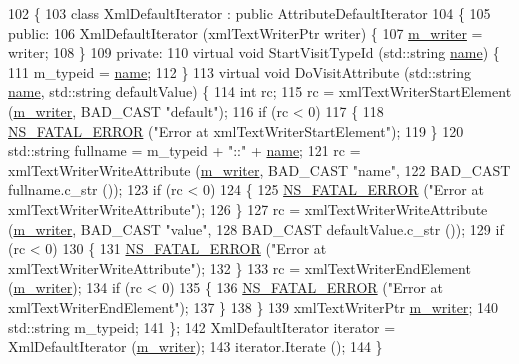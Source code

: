 \begin{DoxyCode}
102 \{
103   \textcolor{keyword}{class }XmlDefaultIterator : \textcolor{keyword}{public} AttributeDefaultIterator
104   \{
105 \textcolor{keyword}{public}:
106     XmlDefaultIterator (xmlTextWriterPtr writer) \{
107       \hyperlink{classns3_1_1XmlConfigSave_a838ec47c15d124d23133a8e633c40397}{m\_writer} = writer;
108     \}
109 \textcolor{keyword}{private}:
110     \textcolor{keyword}{virtual} \textcolor{keywordtype}{void} StartVisitTypeId (std::string \hyperlink{generate__test__data__lte__spectrum__model_8m_ab74e6bf80237ddc4109968cedc58c151}{name}) \{
111       m\_typeid = \hyperlink{generate__test__data__lte__spectrum__model_8m_ab74e6bf80237ddc4109968cedc58c151}{name};
112     \}
113     \textcolor{keyword}{virtual} \textcolor{keywordtype}{void} DoVisitAttribute (std::string \hyperlink{generate__test__data__lte__spectrum__model_8m_ab74e6bf80237ddc4109968cedc58c151}{name}, std::string defaultValue) \{
114       \textcolor{keywordtype}{int} rc;
115       rc = xmlTextWriterStartElement (\hyperlink{classns3_1_1XmlConfigSave_a838ec47c15d124d23133a8e633c40397}{m\_writer}, BAD\_CAST \textcolor{stringliteral}{"default"});
116       \textcolor{keywordflow}{if} (rc < 0)
117         \{
118           \hyperlink{group__fatal_ga5131d5e3f75d7d4cbfd706ac456fdc85}{NS\_FATAL\_ERROR} (\textcolor{stringliteral}{"Error at xmlTextWriterStartElement"});
119         \}
120       std::string fullname = m\_typeid + \textcolor{stringliteral}{"::"} + \hyperlink{generate__test__data__lte__spectrum__model_8m_ab74e6bf80237ddc4109968cedc58c151}{name};
121       rc = xmlTextWriterWriteAttribute (\hyperlink{classns3_1_1XmlConfigSave_a838ec47c15d124d23133a8e633c40397}{m\_writer}, BAD\_CAST \textcolor{stringliteral}{"name"},
122                                         BAD\_CAST fullname.c\_str ());
123       \textcolor{keywordflow}{if} (rc < 0)
124         \{
125           \hyperlink{group__fatal_ga5131d5e3f75d7d4cbfd706ac456fdc85}{NS\_FATAL\_ERROR} (\textcolor{stringliteral}{"Error at xmlTextWriterWriteAttribute"});
126         \}
127       rc = xmlTextWriterWriteAttribute (\hyperlink{classns3_1_1XmlConfigSave_a838ec47c15d124d23133a8e633c40397}{m\_writer}, BAD\_CAST \textcolor{stringliteral}{"value"},
128                                         BAD\_CAST defaultValue.c\_str ());
129       \textcolor{keywordflow}{if} (rc < 0)
130         \{
131           \hyperlink{group__fatal_ga5131d5e3f75d7d4cbfd706ac456fdc85}{NS\_FATAL\_ERROR} (\textcolor{stringliteral}{"Error at xmlTextWriterWriteAttribute"});
132         \}
133       rc = xmlTextWriterEndElement (\hyperlink{classns3_1_1XmlConfigSave_a838ec47c15d124d23133a8e633c40397}{m\_writer});
134       \textcolor{keywordflow}{if} (rc < 0) 
135         \{
136           \hyperlink{group__fatal_ga5131d5e3f75d7d4cbfd706ac456fdc85}{NS\_FATAL\_ERROR} (\textcolor{stringliteral}{"Error at xmlTextWriterEndElement"});
137         \}
138     \}
139     xmlTextWriterPtr \hyperlink{classns3_1_1XmlConfigSave_a838ec47c15d124d23133a8e633c40397}{m\_writer};
140     std::string m\_typeid;
141   \};
142   XmlDefaultIterator iterator = XmlDefaultIterator (\hyperlink{classns3_1_1XmlConfigSave_a838ec47c15d124d23133a8e633c40397}{m\_writer});
143   iterator.Iterate ();
144 \}
\end{DoxyCode}
